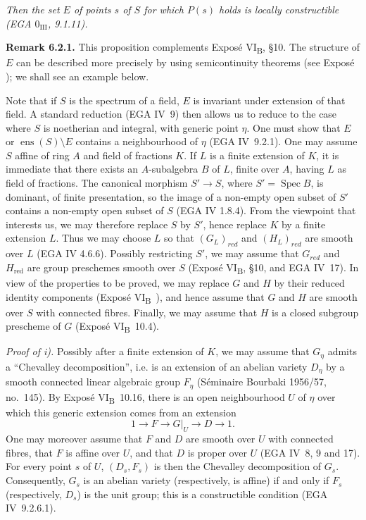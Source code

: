 \emph{Then the set \(E\) of points \(s\) of \(S\) for which \(P(s)\)
holds is locally constructible (EGA \(0_{\mathrm{III}}\), 9.1.11).}

\textbf{Remark 6.2.1.} This proposition complements Exposé
VI\textsubscript{B}, \S10. The structure of \(E\) can be described
more precisely by using semicontinuity theorems (see Exposé );
we shall see an example below.

Note that if \(S\) is the spectrum of a field, \(E\) is invariant
under extension of that field. A standard reduction (EGA IV~9)
then allows us to reduce to the case where \(S\) is noetherian and
integral, with generic point \(\eta\). One must show that \(E\) or
\(\operatorname{ens}(S)\setminus E\) contains a neighbourhood of
\(\eta\) (EGA IV~9.2.1). One
may assume \(S\) affine of ring \(A\) and field of fractions \(K\). If \(L\) is a finite extension of \(K\), it is immediate that
there exists an \(A\)-subalgebra \(B\) of \(L\), finite over \(A\), having \(L\) as field of fractions. The canonical morphism \(S'
\to S\), where \(S' = \operatorname{Spec} B\), is dominant, of finite presentation, so the image of a non-empty open subset
of \(S'\) contains a non-empty open subset of \(S\) (EGA IV 1.8.4). From the viewpoint that interests us, we may therefore
replace \(S\) by \(S'\), hence replace \(K\) by a finite extension \(L\). Thus we may choose \(L\) so that \((G_{L})_{red}\) and
\((H_{L})_{red}\) are smooth over \(L\) (EGA IV 4.6.6). Possibly restricting \(S'\), we may assume that \(G_{red}\) and
\(H_{\mathrm{red}}\) are group preschemes smooth over \(S\)
(Exposé VI\textsubscript{B}, \S10, and EGA IV~17). In view of the
properties to be proved, we may replace \(G\) and \(H\) by their
reduced identity components (Exposé VI\textsubscript{B}~), and
hence assume that \(G\) and \(H\) are smooth over \(S\) with
connected fibres. Finally, we may assume that \(H\) is a closed
subgroup prescheme of \(G\) (Exposé VI\textsubscript{B}~10.4).

\emph{Proof of i).} Possibly after a finite extension of \(K\), we
may assume that \(G_{\eta}\) admits a ``Chevalley decomposition'',
i.e. is an extension of an abelian variety \(D_{\eta}\) by a smooth
connected linear algebraic group \(F_{\eta}\) (Séminaire Bourbaki
1956/57, no.~145). By Exposé VI\textsubscript{B}~10.16, there is an
open neighbourhood \(U\) of \(\eta\) over which this generic
extension comes from an extension
\[
  1\longrightarrow F\longrightarrow G|_U\longrightarrow D
  \longrightarrow 1.
\]
One may moreover assume that \(F\) and \(D\) are smooth over \(U\)
with connected fibres, that \(F\) is affine over \(U\), and that
\(D\) is proper over \(U\) (EGA IV~8, 9 and 17). For every point
\(s\) of \(U\), \((D_s,F_s)\) is then the Chevalley decomposition of
\(G_s\). Consequently, \(G_s\) is an abelian variety (respectively,
is affine) if and only if \(F_s\) (respectively, \(D_s\)) is the unit
group; this is a constructible condition (EGA IV~9.2.6.1).

